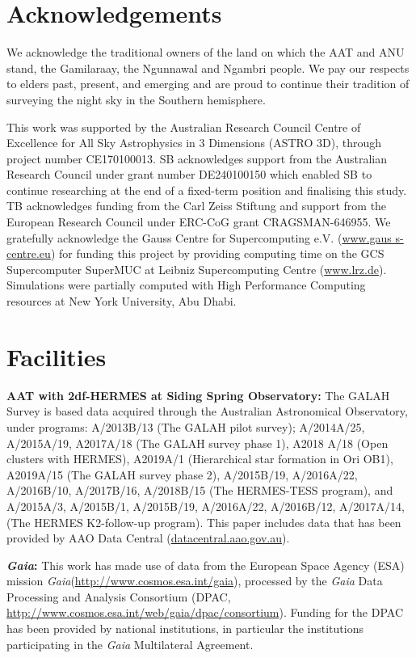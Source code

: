 \documentclass[fleqn,usenatbib]{mnras}
\newcommand{\Gaia}{\textit{Gaia}\xspace} %
\begin{document}
\section*{Acknowledgements}

We acknowledge the traditional owners of the land on which the AAT and ANU stand, the Gamilaraay, the Ngunnawal and Ngambri people. We pay our respects to elders past, present, and emerging and are proud to continue their tradition of surveying the night sky in the Southern hemisphere.

This work was supported by the Australian Research Council Centre of Excellence for All Sky Astrophysics in 3 Dimensions (ASTRO 3D), through project number CE170100013. SB acknowledges support from the Australian Research Council under grant number DE240100150 which enabled SB to continue researching at the end of a fixed-term position and finalising this study. TB acknowledges funding from the Carl Zeiss Stiftung and support from the European Research Council under ERC-CoG grant CRAGSMAN-646955. We gratefully acknowledge the Gauss Centre for Supercomputing e.V. (\url{www.gaus s-centre.eu}) for funding this project by providing computing time on the GCS Supercomputer SuperMUC at Leibniz Supercomputing Centre (\url{www.lrz.de}). Simulations were partially computed with High Performance Computing resources at New York University, Abu Dhabi.

\section*{Facilities}

\textbf{AAT with 2df-HERMES at Siding Spring Observatory:} The GALAH Survey is based data acquired through the Australian Astronomical Observatory, under programs: A/2013B/13 (The GALAH pilot survey); A/2014A/25, A/2015A/19, A2017A/18 (The GALAH survey phase 1), A2018 A/18 (Open clusters with HERMES), A2019A/1 (Hierarchical star formation in Ori OB1), A2019A/15 (The GALAH survey phase 2), A/2015B/19, A/2016A/22, A/2016B/10, A/2017B/16, A/2018B/15 (The HERMES-TESS program), and A/2015A/3, A/2015B/1, A/2015B/19, A/2016A/22, A/2016B/12, A/2017A/14, (The HERMES K2-follow-up program). This paper includes data that has been provided by AAO Data Central (\url{datacentral.aao.gov.au}).

\textbf{\Gaia: } This work has made use of data from the European Space Agency (ESA) mission \Gaia (\url{http://www.cosmos.esa.int/gaia}), processed by the \Gaia Data Processing and Analysis Consortium (DPAC, \url{http://www.cosmos.esa.int/web/gaia/dpac/consortium}). Funding for the DPAC has been provided by national institutions, in particular the institutions participating in the \Gaia Multilateral Agreement. 
\end{document}

